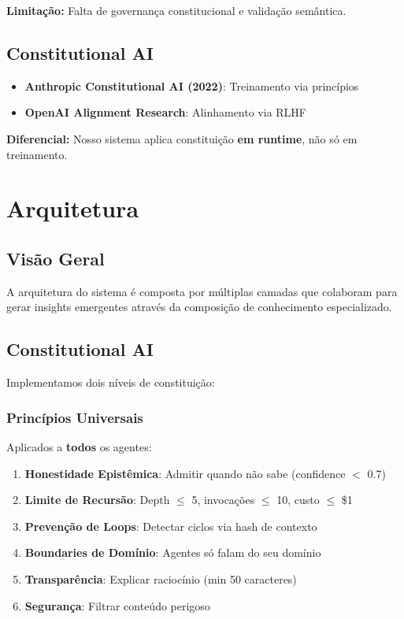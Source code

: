 \documentclass[11pt]{article}
\begin{document}
\textbf{Limitação:} Falta de governança constitucional e validação semântica.

\subsection{Constitutional AI}

\begin{itemize}
    \item \textbf{Anthropic Constitutional AI (2022)}: Treinamento via princípios
    \item \textbf{OpenAI Alignment Research}: Alinhamento via RLHF
\end{itemize}

\textbf{Diferencial:} Nosso sistema aplica constituição \textbf{em runtime}, não só em treinamento.

\section{Arquitetura}

\subsection{Visão Geral}

A arquitetura do sistema é composta por múltiplas camadas que colaboram para gerar insights emergentes através da composição de conhecimento especializado.

\subsection{Constitutional AI}

Implementamos dois níveis de constituição:

\subsubsection{Princípios Universais}

Aplicados a \textbf{todos} os agentes:

\begin{enumerate}
    \item \textbf{Honestidade Epistêmica}: Admitir quando não sabe (confidence $<$ 0.7)
    \item \textbf{Limite de Recursão}: Depth $\leq$ 5, invocações $\leq$ 10, custo $\leq$ \$1
    \item \textbf{Prevenção de Loops}: Detectar ciclos via hash de contexto
    \item \textbf{Boundaries de Domínio}: Agentes só falam do seu domínio
    \item \textbf{Transparência}: Explicar raciocínio (min 50 caracteres)
    \item \textbf{Segurança}: Filtrar conteúdo perigoso
\end{enumerate}
\end{document}
